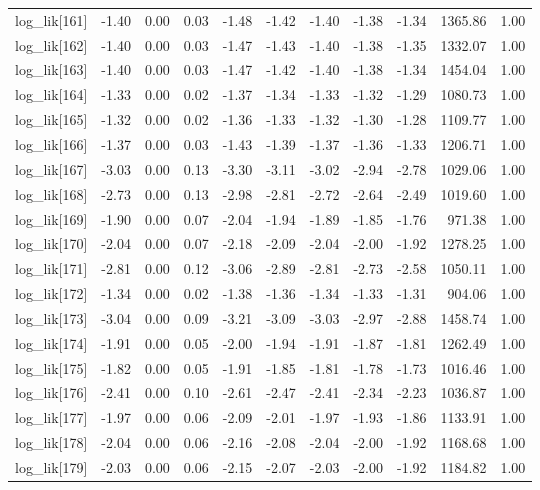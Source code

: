 \begin{table}[ht]
\begin{tabular}{rrrrrrrrrrr}
  log\_lik[161] & -1.40 & 0.00 & 0.03 & -1.48 & -1.42 & -1.40 & -1.38 & -1.34 & 1365.86 & 1.00 \\ 
  log\_lik[162] & -1.40 & 0.00 & 0.03 & -1.47 & -1.43 & -1.40 & -1.38 & -1.35 & 1332.07 & 1.00 \\ 
  log\_lik[163] & -1.40 & 0.00 & 0.03 & -1.47 & -1.42 & -1.40 & -1.38 & -1.34 & 1454.04 & 1.00 \\ 
  log\_lik[164] & -1.33 & 0.00 & 0.02 & -1.37 & -1.34 & -1.33 & -1.32 & -1.29 & 1080.73 & 1.00 \\ 
  log\_lik[165] & -1.32 & 0.00 & 0.02 & -1.36 & -1.33 & -1.32 & -1.30 & -1.28 & 1109.77 & 1.00 \\ 
  log\_lik[166] & -1.37 & 0.00 & 0.03 & -1.43 & -1.39 & -1.37 & -1.36 & -1.33 & 1206.71 & 1.00 \\ 
  log\_lik[167] & -3.03 & 0.00 & 0.13 & -3.30 & -3.11 & -3.02 & -2.94 & -2.78 & 1029.06 & 1.00 \\ 
  log\_lik[168] & -2.73 & 0.00 & 0.13 & -2.98 & -2.81 & -2.72 & -2.64 & -2.49 & 1019.60 & 1.00 \\ 
  log\_lik[169] & -1.90 & 0.00 & 0.07 & -2.04 & -1.94 & -1.89 & -1.85 & -1.76 & 971.38 & 1.00 \\ 
  log\_lik[170] & -2.04 & 0.00 & 0.07 & -2.18 & -2.09 & -2.04 & -2.00 & -1.92 & 1278.25 & 1.00 \\ 
  log\_lik[171] & -2.81 & 0.00 & 0.12 & -3.06 & -2.89 & -2.81 & -2.73 & -2.58 & 1050.11 & 1.00 \\ 
  log\_lik[172] & -1.34 & 0.00 & 0.02 & -1.38 & -1.36 & -1.34 & -1.33 & -1.31 & 904.06 & 1.00 \\ 
  log\_lik[173] & -3.04 & 0.00 & 0.09 & -3.21 & -3.09 & -3.03 & -2.97 & -2.88 & 1458.74 & 1.00 \\ 
  log\_lik[174] & -1.91 & 0.00 & 0.05 & -2.00 & -1.94 & -1.91 & -1.87 & -1.81 & 1262.49 & 1.00 \\ 
  log\_lik[175] & -1.82 & 0.00 & 0.05 & -1.91 & -1.85 & -1.81 & -1.78 & -1.73 & 1016.46 & 1.00 \\ 
  log\_lik[176] & -2.41 & 0.00 & 0.10 & -2.61 & -2.47 & -2.41 & -2.34 & -2.23 & 1036.87 & 1.00 \\ 
  log\_lik[177] & -1.97 & 0.00 & 0.06 & -2.09 & -2.01 & -1.97 & -1.93 & -1.86 & 1133.91 & 1.00 \\ 
  log\_lik[178] & -2.04 & 0.00 & 0.06 & -2.16 & -2.08 & -2.04 & -2.00 & -1.92 & 1168.68 & 1.00 \\ 
  log\_lik[179] & -2.03 & 0.00 & 0.06 & -2.15 & -2.07 & -2.03 & -2.00 & -1.92 & 1184.82 & 1.00 \\ 

\end{tabular}
\end{table}
